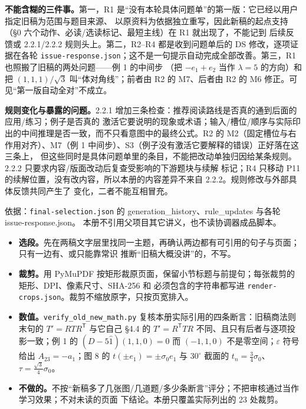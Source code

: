 \documentclass[11pt]{ctexart}
\newcommand{\srcsmall}[1]{{\small\color{inkgray}#1}}
\begin{document}
\textbf{不能含糊的三件事。}第一，R1 是“没有本轮具体问题单”的第一版：它已经以用户指定旧稿为范围与题目来源、
以原资料为依据独立重写，因此新稿的起点支持（§0 六个动作、必读/选读标记、最短主线）在 R1 就出现了，不能记到
后续反馈或 2.2.1/2.2.2 规则头上。第二，R2--R4 都是收到问题单后的 DS 修改，逐项证据在各轮
\texttt{issue-response.json}；这不是一句提示自动完成全部改善。第三，R1 也照搬了旧稿的两处问题——例 1 的中间步
（把 $-e_1+e_2$ 当作 $\lambda=5$ 的方向）和把 $(1,1,1)/\sqrt3$ 叫“体对角线”；前者由 R2 的 M7、后者由 R2 的 M6
修正。可见“第一版自动全对”不成立。

\textbf{规则变化与暴露的问题。}2.2.1 增加三条检查：推荐阅读路线是否真的通到后面的应用/练习；例子是否真的
激活它要说明的现象或术语；输入/槽位/顺序与实际印出的中间推理是否一致，而不只看意图中的最终公式。R2 的 M2（固定槽位与右作用对齐）、M7（例 1 中间步）、S3（例子没有激活它要解释的错误）正好落在这三条上，
但这些同时是具体问题单里的条目，不能把改动单独归因给某条规则。2.2.2 只要求内容/版面改动后复查受影响的下游题块与续解
标记；R4 只移动 P11 的续解位置，没有改内容，所以本册的内容差异不来自 2.2.2。规则修改与外部具体反馈共同产生了
变化，二者不能互相冒充。

\srcsmall{依据：\texttt{final-selection.json} 的 generation\_history、rule\_updates 与各轮 issue-response.json。
本册不引用父项目其它讲义，也不读协调器成品脚本。}

\clearpage
{}

\begin{itemize}
\item \textbf{选段。}先在两稿文字层里找同一主题，再确认两边都有可引用的句子与页面；只有一边有、或只能靠常识
推断“旧稿大概没讲”的，不写。
\item \textbf{裁剪。}用 PyMuPDF 按矩形裁原页面，保留小节标题与前提句；每张裁剪的矩形、DPI、像素尺寸、SHA-256 和
必须包含的字符串都写进 \texttt{render-crops.json}。裁剪不缩放原字，只按页宽排入。
\item \textbf{数值。}\texttt{verify\_old\_new\_math.py} 复核本册实际引用的四条断言：旧稿商法则末句的
$T'=RTR^{\mathsf T}$ 与它自己 §4.4 的 $T'=R^{\mathsf T}TR$ 不同、且只有后者与逐项投影一致；例 1 的
$(D-5\hat1)(1,1,0)=0$ 而 $(-1,1,0)$ 不是零空间；$\varepsilon$ 符号给出 $A_{23}=-a_1$；图 8 的
$t(\pm e_1)=\pm\sigma_0e_1$ 与 $30^\circ$ 截面的 $t_n=\tfrac34\sigma_0$、$\tau=\tfrac{\sqrt3}{4}\sigma_0$。
\item \textbf{不做的。}不按“新稿多了几张图/几道题/多少条断言”评分；不把审核通过当作学习效果；不对未读的页面
下结论。本册只覆盖实际列出的 23 处裁剪。
\end{itemize}
\end{document}
